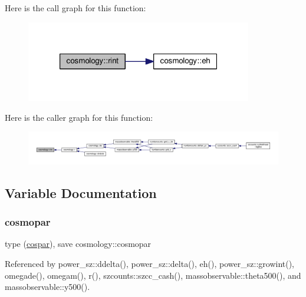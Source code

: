 Here is the call graph for this function\+:
\nopagebreak
\begin{figure}[H]
\begin{center}
\leavevmode
\includegraphics[width=280pt]{namespacecosmology_a9203d5591635fce503b42a2121a1dfaa_cgraph}
\end{center}
\end{figure}
Here is the caller graph for this function\+:
\nopagebreak
\begin{figure}[H]
\begin{center}
\leavevmode
\includegraphics[width=350pt]{namespacecosmology_a9203d5591635fce503b42a2121a1dfaa_icgraph}
\end{center}
\end{figure}


\subsection{Variable Documentation}
\mbox{\label{namespacecosmology_a58e3904346959bd5f3207f5f1f327e0e}} 
\subsubsection{\texorpdfstring{cosmopar}{cosmopar}}
{\footnotesize\ttfamily type (\mbox{\hyperlink{structcosmology_1_1cospar}{cospar}}), save cosmology\+::cosmopar}



Referenced by power\+\_\+sz\+::ddelta(), power\+\_\+sz\+::delta(), eh(), power\+\_\+sz\+::growint(), omegade(), omegam(), r(), szcounts\+::szcc\+\_\+cash(), massobservable\+::theta500(), and massobservable\+::y500().

